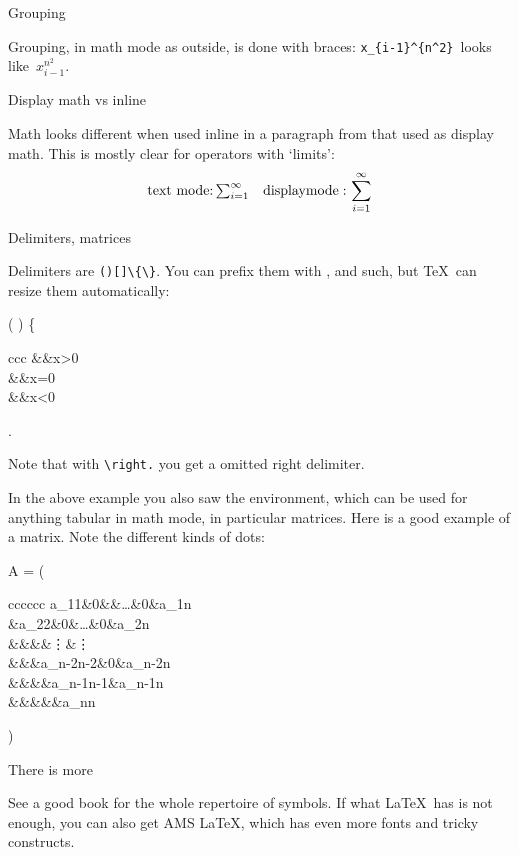  {Grouping}

Grouping, in math mode as outside, is done with braces:
\verb+x_{i-1}^{n^2}+~looks like~$x_{i-1}^{n^2}$.

 {Display math vs inline}

Math looks different when used inline in a paragraph from that used as
display math. This is mostly clear for operators with `limits':
\[ \textrm{text mode:}\,
   \hbox{$\sum_{i=1}^\infty$} \quad
   \mathrm{display mode:}\, \sum_{i=1}^\infty
\]

 {Delimiters, matrices}

Delimiters are \verb+()[]\{\}+. You can prefix them with
,  and such, but \TeX\ can resize them
automatically:
\begin{mathexamplewithcode}
\left(  \right)
\left\{ \begin{array}{ccc}
    &\Rightarrow&x>0\\
    &\Rightarrow&x=0\\
    &\Rightarrow&x<0
        \end{array} \right.
\end{mathexamplewithcode}
Note that with \verb+\right.+ you get a omitted right delimiter.

In the above example you also saw the  environment, which can
be used for anything tabular in math mode, in particular matrices.
Here is a good example of a matrix. Note the different kinds of dots:
\begin{mathexamplewithcode}
 A = \left( \begin{array}{cccccc}
       a_{11}&0&&\ldots&0&a_{1n}\\
       &a_{22}&0&\ldots&0&a_{2n}\\
       &&\ddots&\ddots&\vdots&\vdots\\
       &&&a_{n-2n-2}&0&a_{n-2n}\\ 
       &\emptyset&&&a_{n-1n-1}&a_{n-1n}\\
       &&&&&a_{nn}
     \end{array} \right)
\end{mathexamplewithcode}

 {There is more}

See a good book for the whole repertoire of symbols. If what
\LaTeX\ has is not enough, you can also get AMS \LaTeX, which has even
more fonts and tricky constructs.


